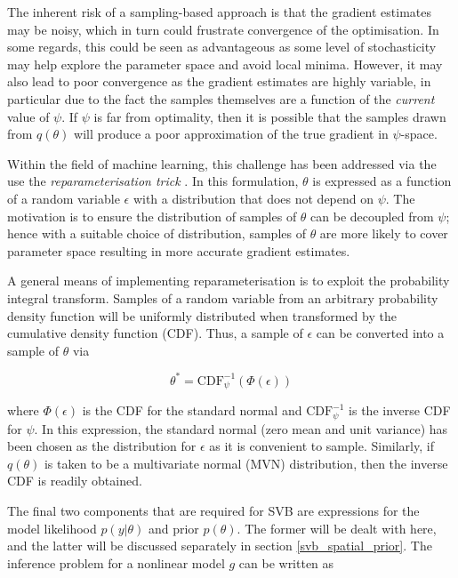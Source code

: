 The inherent risk of a sampling-based approach is that the gradient estimates may be noisy, which in turn could frustrate convergence of the optimisation. In some regards, this could be seen as advantageous as some level of stochasticity may help explore the parameter space and avoid local minima. However, it may also lead to poor convergence as the gradient estimates are highly variable, in particular due to the fact the samples themselves are a function of the \textit{current} value of $\psi$. If $\psi$ is far from optimality, then it is possible that the samples drawn from $q(\theta)$ will produce a poor approximation of the true gradient in $\psi$-space. 

Within the field of machine learning, this challenge has been addressed via the use the \textit{reparameterisation trick} \cite{Kingma2013}. In this formulation, $\theta$ is expressed as a function of a random variable $\epsilon$ with a distribution that does not depend on $\psi$. The motivation is to ensure the distribution of samples of $\theta$ can be decoupled from $\psi$; hence with a suitable choice of distribution, samples of $\theta$ are more likely to cover parameter space resulting in more accurate gradient estimates. 

A general means of implementing reparameterisation is to exploit the probability integral transform. Samples of a random variable from an arbitrary probability density function will be uniformly distributed when transformed by the cumulative density function (CDF). Thus, a sample of $\epsilon$ can be converted into a sample of $\theta$ via

\begin{equation} 
\theta^* = \mathrm{CDF}^{-1}_{\psi} \left( \Phi(\epsilon) \right)
\end{equation}

where $\Phi(\epsilon)$ is the CDF for the standard normal and $\mathrm{CDF}^{-1}_{\psi}$ is the inverse CDF for $\psi$. In this expression, the standard normal (zero mean and unit variance) has been chosen as the distribution for $\epsilon$ as it is convenient to sample. Similarly, if $q(\theta)$ is taken to be a multivariate normal (MVN) distribution, then the inverse CDF is readily obtained. 

The final two components that are required for SVB are expressions for the model likelihood $p(y|\theta)$ and prior $p(\theta)$. The former will be dealt with here, and the latter will be discussed separately in section \ref{svb_spatial_prior}. The inference problem for a nonlinear model $g$ can be written as 

